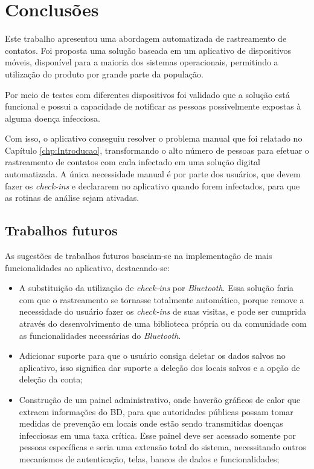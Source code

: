 \chapter{Conclusões}\label{chp:conclusoes}

Este trabalho apresentou uma abordagem automatizada de rastreamento de contatos. Foi proposta uma solução baseada em um aplicativo de dispositivos móveis, disponível para a maioria dos sistemas operacionais, permitindo a utilização do produto por grande parte da população.

Por meio de testes com diferentes dispositivos foi validado que a solução está funcional e possui a capacidade de notificar as pessoas possivelmente expostas à alguma doença infecciosa.

Com isso, o aplicativo conseguiu resolver o problema manual que foi relatado no Capítulo \ref{chp:Introducao}, transformando o alto número de pessoas para efetuar o rastreamento de contatos com cada infectado em uma solução digital automatizada. A única necessidade manual é por parte dos usuários, que devem fazer os \textit{check-ins} e declararem no aplicativo quando forem infectados, para que as rotinas de análise sejam ativadas.

\section{Trabalhos futuros}
As sugestões de trabalhos futuros baseiam-se na implementação de mais funcionalidades ao aplicativo, destacando-se:
\begin{itemize}
    \item A substituição da utilização de \textit{check-ins} por \textit{Bluetooth}. Essa solução faria com que o rastreamento se tornasse totalmente automático, porque remove a necessidade do usuário fazer os \textit{check-ins} de suas visitas, e pode ser cumprida através do desenvolvimento de uma biblioteca própria ou da comunidade com as funcionalidades necessárias do \textit{Bluetooth}.
    \item Adicionar suporte para que o usuário consiga deletar os dados salvos no aplicativo, isso significa dar suporte a deleção dos locais salvos e a opção de deleção da conta;
    \item Construção de um painel administrativo, onde haverão gráficos de calor que extraem informações do BD, para que autoridades públicas possam tomar medidas de prevenção em locais onde estão sendo transmitidas doenças infecciosas em uma taxa crítica. Esse painel deve ser acessado somente por pessoas específicas e seria uma extensão total do sistema, necessitando outros mecanismos de autenticação, telas, bancos de dados e funcionalidades;
\end{itemize}
